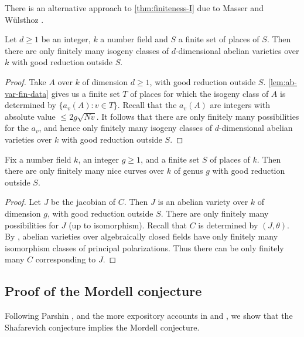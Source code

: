 There is an alternative approach to \autoref{thm:finiteness-I} due to 
Masser and W\"ulsthoz \cite{mw93}. 

\begin{theorem}[Finiteness II]
Let $d\geqslant 1$ be an integer, $k$ a number field and $S$ a finite set of 
places of $S$. Then there are only finitely many isogeny classes of 
$d$-dimensional abelian varieties over $k$ with good reduction outside $S$. 
\end{theorem}
\begin{proof}
Take $A$ over $k$ of dimension $d\geqslant 1$, with good reduction outside $S$. 
\autoref{lem:ab-var-fin-data} gives us a finite set $T$ of places for which 
the isogeny class of $A$ is determined by $\{a_v(A):v\in T\}$. Recall that the 
$a_v(A)$ are integers with absolute value $\leqslant 2 g\sqrt{N v}$. It follows 
that there are only finitely many possibilities for the $a_v$, and hence only 
finitely many isogeny classes of $d$-dimensional abelian varieties over $k$ 
with good reduction outside $S$. 
\end{proof}

\begin{conjecture}
Fix a number field $k$, an integer $g\geqslant 1$, and a finite set $S$ of 
places of $k$. Then there are only finitely many nice curves over $k$ of genus 
$g$ with good reduction outside $S$. 
\end{conjecture}
\begin{proof}
Let $J$ be the jacobian of $C$. Then $J$ is an abelian variety over $k$ of 
dimension $g$, with good reduction outside $S$. There are only finitely many 
possibilities for $J$ (up to isomorphism). Recall that $C$ is determined by 
$(J,\theta)$. By \cite{nn81}, abelian varieties over algebraically closed 
fields have only finitely many isomorphism classes of principal polarizations. 
Thus there can be only finitely many $C$ corresponding to $J$. 
\end{proof}





\subsection{Proof of the Mordell conjecture}

Following Parshin \cite{pa68}, and the more expository accounts in 
\cite[IV.2]{la91} and \cite[V.4]{fa84}, we show that the Shafarevich conjecture 
implies the Mordell conjecture. 

